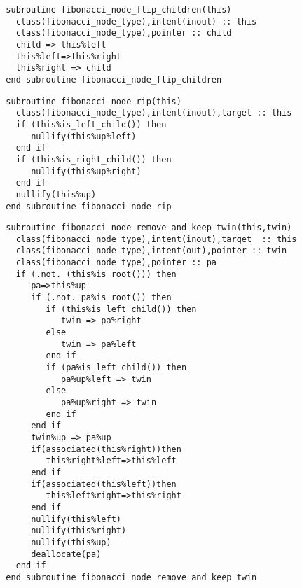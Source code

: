 \begin{Verbatim}
  subroutine fibonacci_node_flip_children(this)
    class(fibonacci_node_type),intent(inout) :: this
    class(fibonacci_node_type),pointer :: child
    child => this%left
    this%left=>this%right
    this%right => child
  end subroutine fibonacci_node_flip_children
\end{Verbatim}

\begin{Verbatim}
  subroutine fibonacci_node_rip(this)
    class(fibonacci_node_type),intent(inout),target :: this
    if (this%is_left_child()) then
       nullify(this%up%left)
    end if
    if (this%is_right_child()) then
       nullify(this%up%right)
    end if
    nullify(this%up)
  end subroutine fibonacci_node_rip
\end{Verbatim}
 
\begin{Verbatim}
  subroutine fibonacci_node_remove_and_keep_twin(this,twin)
    class(fibonacci_node_type),intent(inout),target  :: this
    class(fibonacci_node_type),intent(out),pointer :: twin
    class(fibonacci_node_type),pointer :: pa
    if (.not. (this%is_root())) then
       pa=>this%up
       if (.not. pa%is_root()) then
          if (this%is_left_child()) then         
             twin => pa%right
          else
             twin => pa%left
          end if
          if (pa%is_left_child()) then
             pa%up%left => twin
          else
             pa%up%right => twin
          end if
       end if
       twin%up => pa%up
       if(associated(this%right))then
          this%right%left=>this%left
       end if
       if(associated(this%left))then
          this%left%right=>this%right
       end if
       nullify(this%left)
       nullify(this%right)
       nullify(this%up)
       deallocate(pa)
    end if
  end subroutine fibonacci_node_remove_and_keep_twin
\end{Verbatim}

